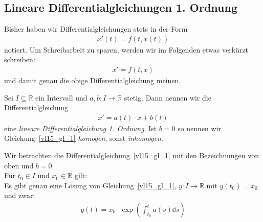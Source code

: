 
\subsection{Lineare Differentialgleichungen 1. Ordnung}

\begin{Bemerkung}{
	Bisher haben wir Differentialgleichungen stets in der Form
	\begin{align*}
		x'(t) = f(t,x(t))
	\end{align*}
	notiert. Um Schreibarbeit zu sparen, werden wir im Folgenden etwas
	 verkürzt schreiben:
	 \begin{align*}
	 	x' = f(t,x)
	 \end{align*}
	 und damit genau die obige Differentialgleichung meinen.
}\end{Bemerkung}

\begin{Definition}{
	Sei $I \subseteq \mathbb{R}$ ein Intervall und $a,b: I \rightarrow \mathbb{R}$ 
	stetig. Dann nennen wir die Differentialgleichung
	\begin{align}\label{vl15_gl_1}
		x' = a(t) \cdot x + b(t)
	\end{align}
	eine \emph{lineare Differentialgleichung 1. Ordnung}.
	Ist $b = 0$ so nennen wir Gleichung~\ref{vl15_gl_1} \emph{homogen}, 
	sonst \emph{inhomogen}.
}\end{Definition}


\begin{Satz}{\label{vl_15_satz_1}
	Wir betrachten die Differentialgleichung~\ref{vl15_gl_1} mit den 
	Bezeichnungen von oben und $b = 0$. \\
	Für $t_0 \in I$ und $x_0 \in \mathbb{R}$ gilt: \\
	Es gibt genau eine Lösung von Gleichung~\ref{vl15_gl_1}, 
	$y : I \rightarrow \mathbb{R}$ mit $y(t_0) = x_0$ und zwar:
	\begin{align*}
		y(t) = x_0 \cdot \exp\left( \int_{t_0}^t a(s) \dd{s} \right)
	\end{align*}
}\end{Satz}

